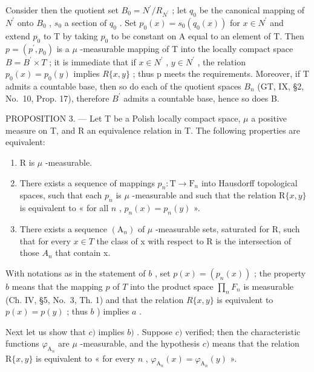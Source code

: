 Consider then the quotient set \(B_{0} = N^{\prime}/R_{N^{\prime}}\) ; let \(q_{0}\) be the canonical mapping of \(N^{\prime}\) onto \(B_{0}\) , \(s_{0}\) a section of \(q_{0}\) . Set \(p_{0}(x) = s_{0}(q_{0}(x))\) for \(x \in N^{\prime}\) and extend \(p_{0}\) to T by taking \(p_{0}\) to be constant on A equal to an element of T. Then \(p = (p^{\prime}, p_{0})\) is a \(\mu\) -measurable mapping of T into the locally compact space \(B = B^{\prime} \times T\) ; it is immediate that if \(x \in N^{\prime}\) , \(y \in N^{\prime}\) , the relation \(p_{0}(x) = p_{0}(y)\) implies \(R\{x, y\}\) ; thus p meets the requirements. Moreover, if T admits a countable base, then so do each of the quotient spaces \(B_{n}\) (GT, IX, §2, No.~10, Prop. 17), therefore \(B^{\prime}\) admits a countable base, hence so does B.

PROPOSITION 3. --- Let T be a Polish locally compact space, \(\mu\) a positive measure on T, and R an equivalence relation in T. The following properties are equivalent:

\begin{enumerate}
\def\labelenumi{\alph{enumi})}
\item
  R is \(\mu\) -measurable.
\item
  There exists a sequence of mappings \(p_n: \mathrm{T} \to \mathrm{F}_n\) into Hausdorff topological spaces, such that each \(p_n\) is \(\mu\) -measurable and such that the relation \(\mathrm{R}\{x, y\}\) is equivalent to « for all \(n\) , \(p_n(x) = p_n(y)\) ».
\item
  There exists a sequence \((\mathrm{A}_{n})\) of \(\mu\) -measurable sets, saturated for R, such that for every \(x \in T\) the class of x with respect to R is the intersection of those \(A_{n}\) that contain x.
\end{enumerate}

With notations as in the statement of \(b\) , set \(p(x) = (p_n(x))\) ; the property \(b\) means that the mapping \(p\) of \(T\) into the product space \(\prod_{n} F_n\) is measurable (Ch. IV, §5, No.~3, Th. 1) and that the relation \(R\{x, y\}\) is equivalent to \(p(x) = p(y)\) ; thus \(b\) ) implies \(a\) .

Next let us show that \(c)\) implies \(b)\) . Suppose \(c)\) verified; then the characteristic functions \(\varphi_{\mathrm{A}_n}\) are \(\mu\) -measurable, and the hypothesis \(c)\) means that the relation \(\mathrm{R}\{x, y\}\) is equivalent to « for every \(n\) , \(\varphi_{\mathrm{A}_n}(x) = \varphi_{\mathrm{A}_n}(y)\) ».

